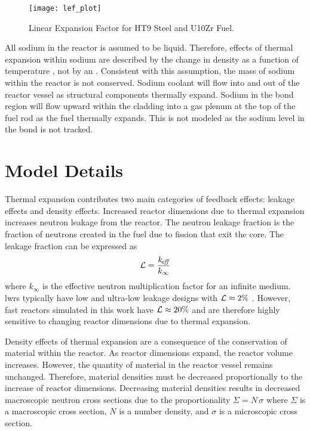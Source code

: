   \begin{figure}
    \centering
    \texttt{[image: lef\_plot]}
    \caption{Linear Expansion Factor for HT9 Steel and U10Zr Fuel.}
    \label{fig:lef_plot}
  \end{figure}

  All sodium in the reactor is assumed to be liquid.  Therefore, effects of
  thermal expansion within sodium are described by the change in density as a
  function of temperature \cite{sodiumProp}, not by an . 
  Consistent with this assumption, the mass of sodium within the reactor is not
  conserved. Sodium coolant will flow into and out of the reactor vessel as
  structural components thermally expand. Sodium in the bond region will flow
  upward within the cladding into a gas plenum at the top of the fuel rod as the
  fuel thermally expands. This is not modeled as the sodium level in the bond is
  not tracked.
    
\section{Model Details}
  \label{sec:model_details}
  Thermal expansion contributes two main categories of feedback effects: leakage
  effects and density effects. Increased reactor dimensions due to thermal
  expansion increases neutron leakage from the reactor. The neutron leakage
  fraction is the fraction of neutrons created in the fuel due to fission that
  exit the core. The leakage fraction can be expressed as
  \begin{equation}
    \label{eq:leakage}
    \mathcal{L} = \frac{k_{\!\mbox{\scriptsize \em eff}}}{k_{\infty}}
  \end{equation}
  where $k_{\infty}$ is the effective neutron multiplication factor for an
  infinite medium. \glspl{lwr} typically have low and ultra-low leakage
  designs with $\mathcal{L} \approx 2 \%$ \cite{textbookknief}. However, fast
  reactors simulated in this work have $\mathcal{L} \approx 20\%$ and are
  therefore highly sensitive to changing reactor dimensions due to thermal 
  expansion.

  Density effects of thermal expansion are a consequence of the conservation of
  material within the reactor. As reactor dimensions expand, the reactor volume
  increases. However, the quantity of material in the reactor vessel remains 
  unchanged. Therefore, material densities must be decreased proportionally to
  the increase of reactor dimensions. Decreasing material densities results in
  decreased macroscopic neutron cross sections due to the proportionality
  $\Sigma = N \, \sigma$ where $\Sigma$ is a macroscopic cross section, $N$ is a
  number density, and $\sigma$ is a microscopic cross section.

